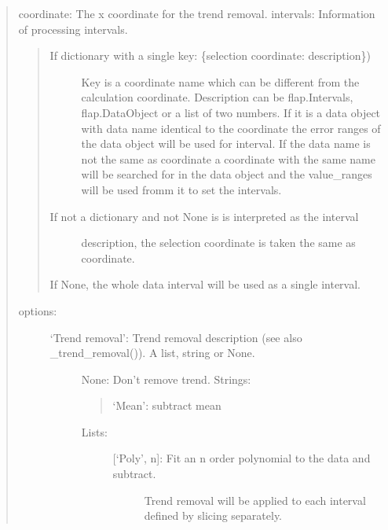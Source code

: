 \documentclass[letterpaper,10pt,english]{sphinxmanual}
\begin{document}
\begin{fulllineitems}
\begin{fulllineitems}
\begin{quote}
coordinate: The x coordinate for the trend removal.
intervals: Information of processing intervals.
\begin{quote}
\begin{description}
\item[{If dictionary with a single key: \{selection coordinate: description\})}] \leavevmode
Key is a coordinate name which can be different from the calculation
coordinate.
Description can be flap.Intervals, flap.DataObject or
a list of two numbers. If it is a data object with data name identical to
the coordinate the error ranges of the data object will be used for
interval. If the data name is not the same as coordinate a coordinate with the
same name will be searched for in the data object and the value\_ranges
will be used fromm it to set the intervals.

\item[{If not a dictionary and not None is is interpreted as the interval}] \leavevmode
description, the selection coordinate is taken the same as
coordinate.

\end{description}

If None, the whole data interval will be used as a single interval.
\end{quote}
\begin{description}
\item[{options:}] \leavevmode\begin{description}
\item[{‘Trend removal’: Trend removal description (see also \_trend\_removal()). A list, string or None.}] \leavevmode
None: Don’t remove trend.
Strings:
\begin{quote}

‘Mean’: subtract mean
\end{quote}
\begin{description}
\item[{Lists:}] \leavevmode\begin{description}
\item[{{[}‘Poly’, n{]}: Fit an n order polynomial to the data and subtract.}] \leavevmode
Trend removal will be applied to each interval defined by slicing
separately.

\end{description}

\end{description}

\end{description}


\end{description}
\end{quote}
\end{fulllineitems}
\end{fulllineitems}
\end{document}
